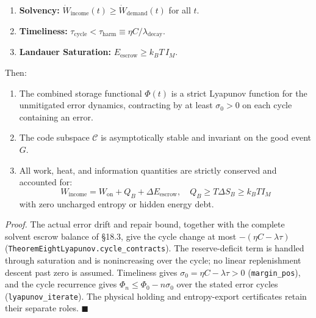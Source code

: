 \documentclass[
]{article}
\providecommand{\tightlist}{%
  \setlength{\itemsep}{0pt}\setlength{\parskip}{0pt}}
\begin{document}
\begin{enumerate}
\def\labelenumi{\arabic{enumi}.}
\tightlist
\item
  \textbf{Solvency:}
  \(\dot W_{\mathrm{income}}(t) \ge \dot W_{\mathrm{demand}}(t)\) for
  all \(t\).
\item
  \textbf{Timeliness:}
  \(\tau_{\mathrm{cycle}} < \tau_{\mathrm{harm}} \equiv \eta C / \lambda_{\mathrm{decay}}\).
\item
  \textbf{Landauer Saturation:}
  \(E_{\mathrm{escrow}} \ge k_B T \, I_M\).
\end{enumerate}

Then:

\begin{enumerate}
\def\labelenumi{\arabic{enumi}.}
\tightlist
\item
  The combined storage functional \(\Phi(t)\) is a strict Lyapunov
  function for the unmitigated error dynamics, contracting by at least
  \(\sigma_0 > 0\) on each cycle containing an error.
\item
  The code subspace \(\mathcal{C}\) is asymptotically stable and
  invariant on the good event \(G\).
\item
  All work, heat, and information quantities are strictly conserved and
  accounted for:
  \[W_{\mathrm{income}} = W_{\mathrm{on}} + Q_B + \Delta E_{\mathrm{escrow}}, \quad Q_B \ge T \Delta S_B \ge k_B T I_M\]
  with zero uncharged entropy or hidden energy debt.
\end{enumerate}

\emph{Proof.} The actual error drift and repair bound, together with the
complete solvent escrow balance of §18.3, give the cycle change at most
\(-(\eta C-\lambda\tau)\)
(\texttt{T\allowbreak{}h\allowbreak{}e\allowbreak{}o\allowbreak{}r\allowbreak{}e\allowbreak{}m\allowbreak{}E\allowbreak{}i\allowbreak{}g\allowbreak{}h\allowbreak{}t\allowbreak{}L\allowbreak{}y\allowbreak{}a\allowbreak{}p\allowbreak{}u\allowbreak{}n\allowbreak{}o\allowbreak{}v\allowbreak{}.\allowbreak{}c\allowbreak{}y\allowbreak{}c\allowbreak{}l\allowbreak{}e\allowbreak{}\_\allowbreak{}c\allowbreak{}o\allowbreak{}n\allowbreak{}t\allowbreak{}r\allowbreak{}a\allowbreak{}c\allowbreak{}t\allowbreak{}s}).
The reserve-deficit term is handled through saturation and is
nonincreasing over the cycle; no linear replenishment descent past zero
is assumed. Timeliness gives \(\sigma_0=\eta C-\lambda\tau>0\)
(\texttt{margin\_pos}), and the cycle recurrence gives
\(\Phi_n\le\Phi_0-n\sigma_0\) over the stated error cycles
(\texttt{lyapunov\_iterate}). The physical holding and entropy-export
certificates retain their separate roles. \(\blacksquare\)
\end{document}
